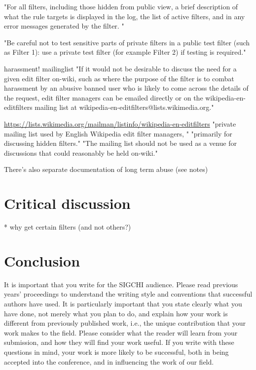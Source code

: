 \documentclass{sigchi}
\begin{document}
"For all filters, including those hidden from public view, a brief description of what the rule targets is displayed in the log, the list of active filters, and in any error messages generated by the filter. "

"Be careful not to test sensitive parts of private filters in a public test filter (such as Filter 1): use a private test filter (for example Filter 2) if testing is required."

harassment! mailinglist
"If it would not be desirable to discuss the need for a given edit filter on-wiki, such as where the purpose of the filter is to combat harassment by an abusive banned user who is likely to come across the details of the request, edit filter managers can be emailed directly or on the wikipedia-en-editfilters mailing list at wikipedia-en-editfilters@lists.wikimedia.org."

\url{https://lists.wikimedia.org/mailman/listinfo/wikipedia-en-editfilters}
"private mailing list used by English Wikipedia edit filter managers, "
"primarily for discussing hidden filters."
"The mailing list should not be used as a venue for discussions that could reasonably be held on-wiki."

There's also separate documentation of long term abuse (see notes)


\section{Critical discussion}

* why get certain filters (and not others?)

\section{Conclusion}

It is important that you write for the SIGCHI audience. Please read
previous years' proceedings to understand the writing style and
conventions that successful authors have used. It is particularly
important that you state clearly what you have done, not merely what
you plan to do, and explain how your work is different from previously
published work, i.e., the unique contribution that your work makes to
the field. Please consider what the reader will learn from your
submission, and how they will find your work useful. If you write with
these questions in mind, your work is more likely to be successful,
both in being accepted into the conference, and in influencing the
work of our field.
\end{document}
